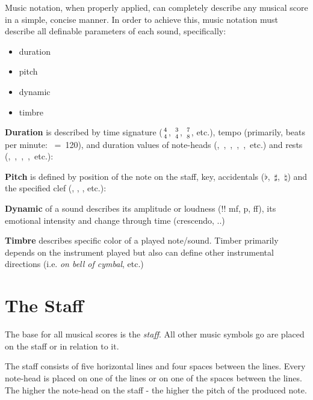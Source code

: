 \graphicspath{{img/music_notation/}}

Music notation, when properly applied, can completely describe any musical score in a simple, concise manner. In order
to achieve this, music notation must describe all definable parameters of each sound, specifically\cite{mcgrain1990music}:

\begin{itemize}
    \item duration
    \item pitch
    \item dynamic
    \item timbre
\end{itemize}

\textbf{Duration} is described by time signature ($4\atop4$, $3\atop4$, $7\atop8$, etc.), tempo (primarily, beats per
minute: \Vier~=~120), and duration values of note-heads (\Ganz,~\Halb,~\Vier,~\AAcht,~\Sech,~etc.) and rests
(\GaPa,~\ViPa,~\AcPa,~\SePa,~etc.):



\textbf{Pitch} is defined by position of the note on the staff, key, accidentals ($\flat$,~$\sharp$,~$\natural$) and
the specified clef (\inlinemusic\smalltrebleclef, \inlinemusic\smallbassclef, \inlinemusic\smallaltoclef, etc.):



\textbf{Dynamic} of a sound describes its amplitude or loudness (!! mf, p, ff), its emotional intensity and change
through time (crescendo, ..)

\textbf{Timbre} describes specific color of a played note/sound. Timber primarily depends on the instrument played but
also can define other instrumental directions (i.e. \textit{on bell of cymbal}, etc.)


\section{The Staff}\label{sec:the_staff}
The base for all musical scores is the \textit{staff}. All other music symbols go are placed on the staff or in relation
to it.

The staff consists of five horizontal lines and four spaces between the lines. Every note-head is placed on one of
the lines or on one of the spaces between the lines. The higher the note-head on the staff - the higher the pitch of
the produced note.


